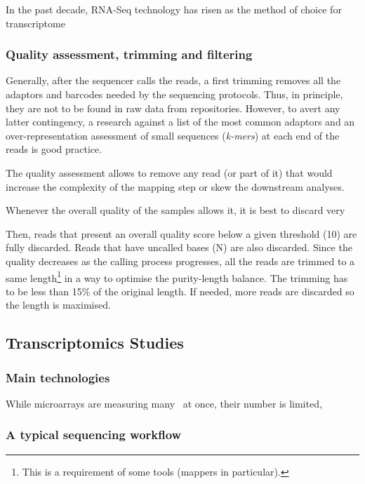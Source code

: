 In the past decade, \gls{RNA-Seq} technology has risen as the method of choice
for  transcriptome



\subsubsection{Quality assessment, trimming and filtering}





\NB Generally, after the sequencer calls the reads, a first trimming removes
all the adaptors and barcodes needed by the sequencing protocols. Thus,
in principle, they are not to be found in raw data from repositories.
However, to avert any latter contingency, a research against
a list of the most common adaptors and an over-representation assessment of small
sequences (\emph{k-mers}) at each end of the reads is good practice.




The quality assessment allows to remove any read (or part of it) that would
increase the complexity of the mapping step or skew the downstream analyses.

Whenever the overall quality of the samples allows it, it is best to discard very


Then, reads that present an overall quality score below a given threshold (10) are
    fully discarded. Reads that have uncalled bases (\textsc{N}) are also discarded.
    Since the quality decreases as the calling process progresses, all the reads are
    trimmed to a same length\footnote{This is a requirement of some tools (mappers
    in particular).} in a way to optimise the purity-length balance. The trimming has
    to be less than 15\% of the original length. If needed, more reads are discarded
    so the length is maximised.








\subsection{Transcriptomics Studies}
    \subsubsection{Main technologies}
While microarrays are measuring many \mRNAs\ at once, their number is limited,
    \subsubsection{A typical sequencing workflow}

